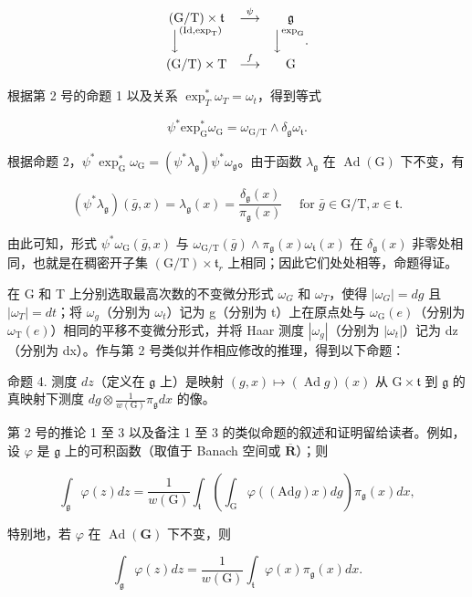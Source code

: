 \[
\begin{array}{c c c} (\mathrm{G} / \mathrm{T}) \times \mathfrak {t} & \stackrel {{\psi}} {{\longrightarrow}} & \mathfrak {g} \\ \Big \downarrow^ {(\mathrm{Id}, \exp_ {\mathrm{T}})} & & \Big \downarrow^ {\exp_ {\mathrm{G}}} . \\ (\mathrm{G} / \mathrm{T}) \times \mathrm{T} & \stackrel {{f}} {{\longrightarrow}} & \mathrm{G} \end{array}
\]

根据第 2 号的命题 1 以及关系 \(\exp_{T}^{*}\omega_{T} = \omega_{t}\)，得到等式

\[
\psi^ {*} \mathrm{exp} _ {\mathrm{G}} ^ {*} \omega_ {\mathrm{G}} = \omega_ {\mathrm{G/T}} \wedge \delta_ {\mathfrak {g}} \omega_ {\mathfrak {t}}.
\]

根据命题 2，\(\psi^{*}\exp_{\mathrm{G}}^{*}\omega_{\mathrm{G}} = (\psi^{*}\lambda_{\mathfrak{g}})\psi^{*}\omega_{\mathfrak{g}}\)。由于函数 \(\lambda_{\mathfrak{g}}\) 在 \(\operatorname{Ad}(\mathrm{G})\) 下不变，有

\[
(\psi^ {*} \lambda_ {\mathfrak {g}}) (\bar {g}, x) = \lambda_ {\mathfrak {g}} (x) = \frac {\delta_ {\mathfrak {g}} (x)}{\pi_ {\mathfrak {g}} (x)} \quad \text { for } \bar {g} \in \mathrm{G/T}, x \in \mathfrak {t}.
\]

由此可知，形式 \(\psi^{*}\omega_{\mathrm{G}}(\bar{g},x)\) 与 \(\omega_{\mathrm{G / T}}(\bar{g})\wedge \pi_{\mathfrak{g}}(x)\omega_{\mathfrak{t}}(x)\) 在 \(\delta_{\mathfrak{g}}(x)\) 非零处相同，也就是在稠密开子集 \((\mathrm{G / T})\times \mathfrak{t}_r\) 上相同；因此它们处处相等，命题得证。

在 G 和 T 上分别选取最高次数的不变微分形式 \(\omega_{G}\) 和 \(\omega_{T}\)，使得 \(|\omega_{G}| = dg\) 且 \(|\omega_{T}| = dt\)；将 \(\omega_{g}\)（分别为 \(\omega_{t}\)）记为 g（分别为 t）上在原点处与 \(\omega_{\mathrm{G}}(e)\)（分别为 \(\omega_{\mathrm{T}}(e)\)）相同的平移不变微分形式，并将 Haar 测度 \(|\omega_{g}|\)（分别为 \(|\omega_{t}|\)）记为 dz（分别为 dx）。作与第 2 号类似并作相应修改的推理，得到以下命题：

命题 4. 测度 \(dz\)（定义在 \(\mathfrak{g}\) 上）是映射 \((g,x)\mapsto (\operatorname {Ad}g)(x)\) 从 \(\mathrm{G}\times \mathfrak{t}\) 到 \(\mathfrak{g}\) 的真映射下测度 \(dg\otimes \frac{1}{w(\mathrm{G})}\pi_{\mathfrak{g}}dx\) 的像。

第 2 号的推论 1 至 3 以及备注 1 至 3 的类似命题的叙述和证明留给读者。例如，设 \(\varphi\) 是 \(\mathfrak{g}\) 上的可积函数（取值于 Banach 空间或 \(\overline{\mathbf{R}}\)）；则

\[
\int_ {\mathfrak {g}} \varphi (z) d z = \frac {1}{w (\mathrm{G})} \int_ {\mathfrak {t}} \left(\int_ {\mathrm{G}} \varphi ((\mathrm{Ad} g) x) d g\right) \pi_ {\mathfrak {g}} (x) d x,\tag{12}
\]

特别地，若 \(\varphi\) 在 \(\operatorname{Ad}(\mathbf{G})\) 下不变，则

\[
\int_ {\mathfrak {g}} \varphi (z) d z = \frac {1}{w (\mathrm{G})} \int_ {\mathfrak {t}} \varphi (x) \pi_ {\mathfrak {g}} (x) d x.\tag{13}
\]

